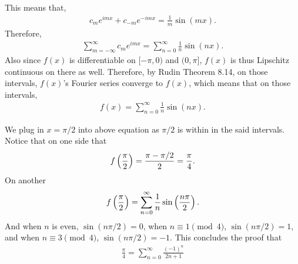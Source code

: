 \documentclass[12pt]{article}
\begin{document}
\begin{fproof}[3(a)]
 This means that,
 \begin{align*}
   c_m e^{imx} + c_{-m}e^{-imx} = \frac{1}{m} \sin(mx).
 \end{align*}
 Therefore,
 \begin{align*}
   \sum_{m = -\infty}^{\infty} c_m e^{imx} = \sum_{n=0}^{\infty} \frac{1}{n} \sin(nx).
 \end{align*}
 Also since \(f(x)\) is differentiable on \([-\pi, 0)\) and \((0, \pi]\), \(f(x)\) is thus Lipschitz continuous on there as well.
 Therefore, by Rudin Theorem 8.14, on those intervals, \(f(x)\)'s Fourier series converge to \(f(x)\), which means that on those intervals,
 \begin{align*}
   f(x) = \sum_{n=0}^{\infty} \frac{1}{n} \sin(nx).
 \end{align*}

\end{fproof}

\begin{fproof}[3(b)]
 We plug in \(x = \pi/2\) into above equation as \(\pi/2\) is within in the said intervals.
 Notice that on one side that
 \begin{align*}
   f\left( \frac{\pi}{2} \right) = \frac{\pi - \pi/2}{2} = \frac{\pi}{4}.
 \end{align*}
 On another 
 \begin{align*}
   f \left( \frac{\pi}{2} \right) = \sum_{n=0}^{\infty} \frac{1}{n} \sin \left( \frac{n \pi}{2} \right).
 \end{align*}
 And when \(n\) is even, \(\sin(n\pi/2) = 0\), when \(n \equiv 1 \pmod 4\), \(\sin(n\pi/2) = 1\), and when \(n \equiv 3 \pmod 4\), \(\sin(n\pi/2) = -1\).
 This concludes the proof that
 \begin{align*}
   \frac{\pi}{4} = \sum_{n=0}^{\infty} \frac{(-1)^n}{2n+1}
 \end{align*}
\end{fproof}
\end{document}
